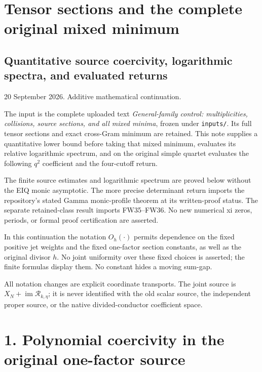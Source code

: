\section{Tensor sections and the complete original mixed minimum}\label{tensor-sections-and-the-complete-original-mixed-minimum}

\subsection{Quantitative source coercivity, logarithmic spectra, and evaluated returns}\label{quantitative-source-coercivity-logarithmic-spectra-and-evaluated-returns}

20 September 2026. Additive mathematical continuation.

The input is the complete uploaded text \emph{General-family control: multiplicities, collisions, source sections, and all mixed minima}, frozen under \texttt{inputs/}. Its full tensor sections and exact cross-Gram minimum are retained. This note supplies a quantitative lower bound before taking that mixed minimum, evaluates its relative logarithmic spectrum, and on the original simple quartet evaluates the following \(q^2\) coefficient and the four-cutoff return.

The finite source estimates and logarithmic spectrum are proved below without the EIQ monic asymptotic. The more precise determinant return imports the repository's stated Gamma monic-profile theorem at its written-proof status. The separate retained-class result imports FW35--FW36. No new numerical xi zeros, periods, or formal proof certification are asserted.

In this continuation the notation \(O_h(\cdot)\) permits dependence on the fixed positive jet weights and the fixed one-factor section constants, as well as the original divisor \(h\). No joint uniformity over these fixed choices is asserted; the finite formulas display them. No constant hides a moving sum-gap.

All notation changes are explicit coordinate transports. The joint source is \(X_N+\operatorname{im}\mathcal R_{k,\eta}\); it is never identified with the old scalar source, the independent proper source, or the native divided-conductor coefficient space.

\section{1. Polynomial coercivity in the original one-factor source}\label{polynomial-coercivity-in-the-original-one-factor-source}


